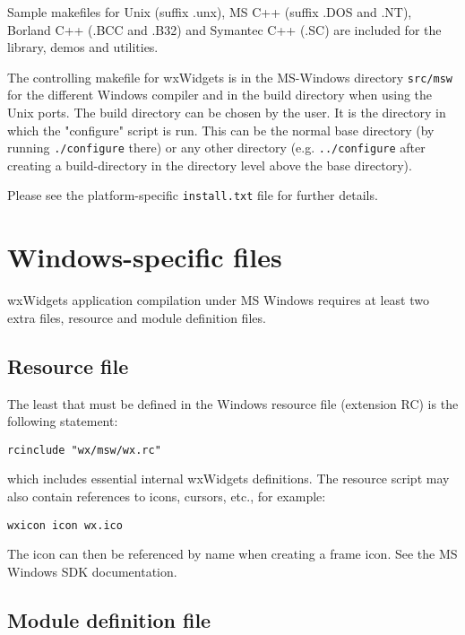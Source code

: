 Sample makefiles for Unix (suffix .unx), MS C++ (suffix .DOS and .NT), Borland
C++ (.BCC and .B32) and Symantec C++ (.SC) are included for the library, demos
and utilities.

The controlling makefile for wxWidgets is in the MS-Windows
directory {\tt src/msw} for the different Windows compiler and
in the build directory when using the Unix ports. The build
directory can be chosen by the user. It is the directory in
which the "configure" script is run. This can be the normal
base directory (by running {\tt ./configure} there) or any other
directory (e.g. {\tt ../configure} after creating a build-directory
in the directory level above the base directory).

Please see the platform-specific {\tt install.txt} file for further details.

\section{Windows-specific files}

wxWidgets application compilation under MS Windows requires at least two
extra files, resource and module definition files.

\subsection{Resource file}\label{resources}

The least that must be defined in the Windows resource file (extension RC)
is the following statement:

\begin{verbatim}
rcinclude "wx/msw/wx.rc"
\end{verbatim}

which includes essential internal wxWidgets definitions.  The resource script
may also contain references to icons, cursors, etc., for example:

\begin{verbatim}
wxicon icon wx.ico
\end{verbatim}

The icon can then be referenced by name when creating a frame icon. See
the MS Windows SDK documentation.


\subsection{Module definition file}

